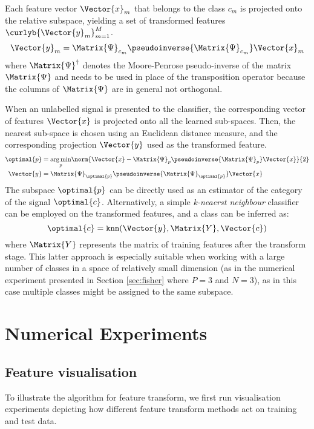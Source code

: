 \documentclass{article}
\def \fea{\Vector{x}} 	%
\def \iFea{n}	 		%
\def \nDim{N} 			%
\def \newFea{\Vector{y}} 	%
\def \NewFeas{\Matrix{Y}}%
\def \nFea{M}			%
\def \iFea{m}			%
\def \cat{c} 			%
\def \cats{\Vector{c}}	%
\def \iCat{p}  		%
\def \nCat{P} 		%
\def \Spa{\Matrix{\Psi}}
\begin{document}
Each feature vector $\fea_{\iFea}$ that belongs to the class $\cat_{\iFea}$ is projected onto the relative subspace, yielding a set of transformed features $\curlyb{\newFea_{\iFea}}_{\iFea=1}^{\nFea}$.
\begin{equation}
\newFea_{\iFea} = \Spa_{\cat_{\iFea}}\pseudoinverse{\Spa_{\cat_{\iFea}}}\fea_{\iFea}
\end{equation}
where $\Spa^{\dagger}$ denotes the Moore-Penrose pseudo-inverse of the matrix $\Spa$ and needs to be used in place of the transposition operator because the columns of $\Spa$ are in general not orthogonal.

When an unlabelled signal is presented to the classifier, the corresponding vector of features $\fea$ is projected onto all the learned sub-spaces. Then, the nearest sub-space is chosen using an Euclidean distance measure, and the corresponding projection $\newFea$ used as the transformed feature.
\begin{align}
	\optimal{\iCat} &= \underset{\iCat}{\arg\min}\norm{\fea-\Spa_{\iCat}\pseudoinverse{\Spa_{\iCat}}\fea}{2}	\\
	\newFea &= \Spa_{\optimal{\iCat}}\pseudoinverse{\Spa_{\optimal{\iCat}}}\fea
\end{align}
The subspace $\optimal{\iCat}$ can be directly used as an estimator of the category of the signal $\optimal{\cat}$. Alternatively, a simple \emph{k-neaerst neighbour} classifier can be employed on the transformed features, and a class can be inferred as:
\begin{equation}
\optimal{\cat} = \texttt{knn}(\newFea,\NewFeas,\cats)
\end{equation}
where $\NewFeas$ represents the matrix of training features after the transform stage. This latter approach is especially suitable when working with a large number of classes in a space of relatively small dimension (as in the numerical experiment presented in Section \ref{sec:fisher} where $\nCat=3$ and $\nDim=3$), as in this case multiple classes might be assigned to the same subspace.
\section{Numerical Experiments}\label{sec:ne}
\subsection{Feature visualisation}
To illustrate the  algorithm for feature transform, we first run visualisation experiments depicting how different feature transform methods act on training and test data.
\end{document}
